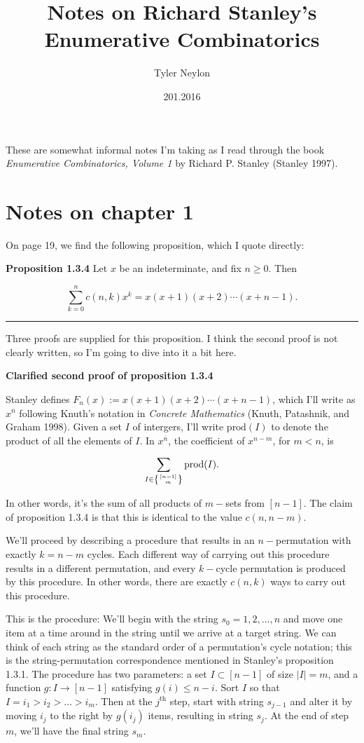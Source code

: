 \documentclass[]{article}
\title{Notes on Richard Stanley's Enumerative Combinatorics}
\author{Tyler Neylon}
\date{201.2016}
\begin{document}
\maketitle

These are somewhat informal notes I'm taking as I read through the book
\emph{Enumerative Combinatorics, Volume 1} by Richard P. Stanley
(Stanley 1997).

\section{Notes on chapter 1}\label{notes-on-chapter-1}

On page 19, we find the following proposition, which I quote directly:

\textbf{Proposition 1.3.4} Let \(x\) be an indeterminate, and fix
\(n\ge 0\). Then

\[\sum_{k=0}^n c(n,k) x^k = x(x + 1)(x + 2)\cdots (x + n - 1).\]

\begin{center}\rule{0.5\linewidth}{\linethickness}\end{center}

Three proofs are supplied for this proposition. I think the second proof
is not clearly written, so I'm going to dive into it a bit here.

\textbf{Clarified second proof of proposition 1.3.4}

Stanley defines \(F_n(x) := x(x + 1)(x + 2)\cdots (x + n - 1)\), which
I'll write as \(x^{\overline{n}}\) following Knuth's notation in
\emph{Concrete Mathematics} (Knuth, Patashnik, and Graham 1998). Given a
set \(I\) of intergers, I'll write \(\text{prod}(I)\) to denote the
product of all the elements of \(I\). In \(x^{\overline{n}}\), the
coefficient of \(x^{n-m}\), for \(m<n\), is

\[ \sum_{I \in \left\{{[n-1]\atop m}\right\}} \text{prod}(I). \]

In other words, it's the sum of all products of \(m-\)sets from
\([n-1]\). The claim of proposition 1.3.4 is that this is identical to
the value \(c(n,n-m)\).

We'll proceed by describing a procedure that results in an
\(n-\)permutation with exactly \(k=n-m\) cycles. Each different way of
carrying out this procedure results in a different permutation, and
every \(k-\)cycle permutation is produced by this procedure. In other
words, there are exactly \(c(n, k)\) ways to carry out this procedure.

This is the procedure: We'll begin with the string
\(s_0 = 1, 2, \ldots, n\) and move one item at a time around in the
string until we arrive at a target string. We can think of each string
as the standard order of a permutation's cycle notation; this is the
string-permutation correspondence mentioned in Stanley's proposition
1.3.1. The procedure has two parameters: a set \(I \subset [n-1]\) of
size \(|I| = m\), and a function \(g:I\to [n-1]\) satisfying
\(g(i) \le n - i\). Sort \(I\) so that \(I = i_1 > i_2 > \ldots > i_m\).
Then at the \(j^\text{th}\) step, start with string \(s_{j-1}\) and
alter it by moving \(i_j\) to the right by \(g(i_j)\) items, resulting
in string \(s_j\). At the end of step \(m\), we'll have the final string
\(s_m\).
\end{document}
